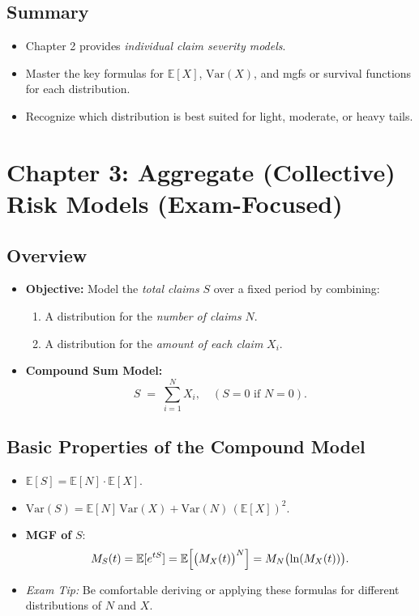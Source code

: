 \documentclass[13pt,a4paper]{article}
\begin{document}
\subsection{Summary}
\begin{itemize}
  \item Chapter 2 provides \emph{individual claim severity models}.
  \item Master the key formulas for \(\mathbb{E}[X]\), \(\mathrm{Var}(X)\), and mgfs or survival functions for each distribution. 
  \item Recognize which distribution is best suited for light, moderate, or heavy tails. 
\end{itemize}

\section{Chapter 3: Aggregate (Collective) Risk Models (Exam-Focused)}
\label{sec:chapter3}

\subsection{Overview}
\begin{itemize}
  \item \textbf{Objective:} Model the \emph{total claims} \(S\) over a fixed period by combining:
    \begin{enumerate}
      \item A distribution for the \emph{number of claims} \(N\).
      \item A distribution for the \emph{amount of each claim} \(X_i\).
    \end{enumerate}
  \item \textbf{Compound Sum Model:}
  \[
    S \;=\; \sum_{i=1}^{N} X_i, 
    \quad (S=0 \text{ if } N=0).
  \]
\end{itemize}

\subsection{Basic Properties of the Compound Model}
\begin{itemize}
  \item \(\mathbb{E}[S] = \mathbb{E}[N]\cdot \mathbb{E}[X]\).
  \item \(\mathrm{Var}(S) = \mathbb{E}[N] \,\mathrm{Var}(X) + \mathrm{Var}(N)\,(\mathbb{E}[X])^2.\)
  \item \textbf{MGF of } \(S\):
  \[
    M_S(t) = \mathbb{E}[e^{tS}] 
            = \mathbb{E}\Bigl[\bigl(M_X(t)\bigr)^N\Bigr]
            = M_N\bigl(\ln(M_X(t))\bigr).
  \]
  \item \emph{Exam Tip:} Be comfortable deriving or applying these formulas for different distributions of \(N\) and \(X\).
\end{itemize}
\end{document}
